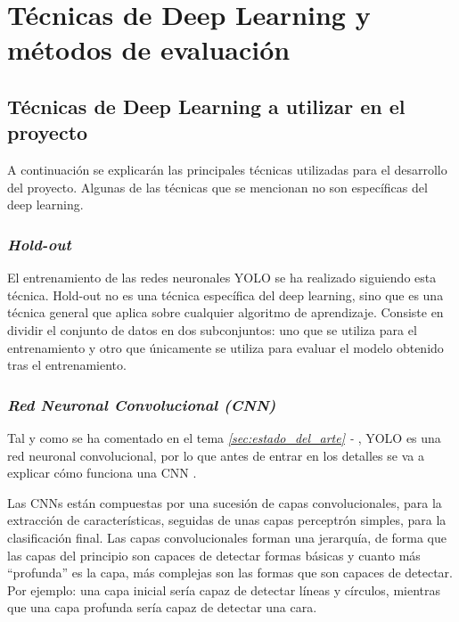 \section{Técnicas de Deep Learning y métodos de evaluación}
\label{sec:tecnicas_de_deep_learning_y_metodos_de_evaluacion}

\subsection{Técnicas de Deep Learning a utilizar en el proyecto}

A continuación se explicarán las principales técnicas utilizadas para el desarrollo del proyecto. Algunas de las técnicas que se mencionan no son específicas del deep learning.

\subsubsection*{\textit{Hold-out}}

El entrenamiento de las redes neuronales YOLO se ha realizado siguiendo esta técnica. Hold-out no es una técnica específica del deep learning, sino que es una técnica general que aplica sobre cualquier algoritmo de aprendizaje. Consiste en dividir el conjunto de datos en dos subconjuntos: uno que se utiliza para el entrenamiento y otro que únicamente se utiliza para evaluar el modelo obtenido tras el entrenamiento.

\subsubsection*{\textit{Red Neuronal Convolucional (CNN)}}

Tal y como se ha comentado en el tema \textit{\ref{sec:estado_del_arte} - }, YOLO es una red neuronal convolucional, por lo que antes de entrar en los detalles se va a explicar cómo funciona una CNN \cite{s5_cnn1} \cite{s5_cnn2}.

Las CNNs están compuestas por una sucesión de capas convolucionales, para la extracción de características, seguidas de unas capas perceptrón simples, para la clasificación final. Las capas convolucionales forman una jerarquía, de forma que las capas del principio son capaces de detectar formas básicas y cuanto más ``profunda'' es la capa, más complejas son las formas que son capaces de detectar. Por ejemplo: una capa inicial sería capaz de detectar líneas y círculos, mientras que una capa profunda sería capaz de detectar una cara.

